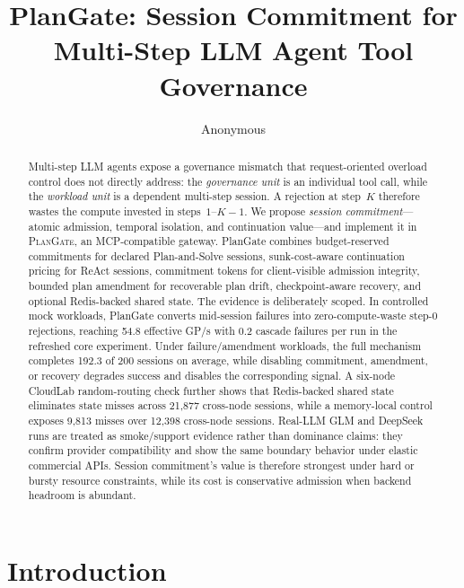 \documentclass[sigconf,review,anonymous]{acmart}
\begin{document}
\title{PlanGate: Session Commitment for Multi-Step LLM Agent Tool Governance}

\author{Anonymous}

\begin{abstract}
Multi-step LLM agents expose a governance mismatch that request-oriented overload control does not directly address: the \emph{governance unit} is an individual tool call, while the \emph{workload unit} is a dependent multi-step session. A rejection at step~$K$ therefore wastes the compute invested in steps~$1$--$K{-}1$. We propose \emph{session commitment}---atomic admission, temporal isolation, and continuation value---and implement it in \textsc{PlanGate}, an MCP-compatible gateway. PlanGate combines budget-reserved commitments for declared Plan-and-Solve sessions, sunk-cost-aware continuation pricing for ReAct sessions, commitment tokens for client-visible admission integrity, bounded plan amendment for recoverable plan drift, checkpoint-aware recovery, and optional Redis-backed shared state. The evidence is deliberately scoped. In controlled mock workloads, PlanGate converts mid-session failures into zero-compute-waste step-0 rejections, reaching 54.8 effective GP/s with 0.2 cascade failures per run in the refreshed core experiment. Under failure/amendment workloads, the full mechanism completes 192.3 of 200 sessions on average, while disabling commitment, amendment, or recovery degrades success and disables the corresponding signal. A six-node CloudLab random-routing check further shows that Redis-backed shared state eliminates state misses across 21,877 cross-node sessions, while a memory-local control exposes 9,813 misses over 12,398 cross-node sessions. Real-LLM GLM and DeepSeek runs are treated as smoke/support evidence rather than dominance claims: they confirm provider compatibility and show the same boundary behavior under elastic commercial APIs. Session commitment's value is therefore strongest under hard or bursty resource constraints, while its cost is conservative admission when backend headroom is abundant.
\end{abstract}

\maketitle

\section{Introduction}
\end{document}
